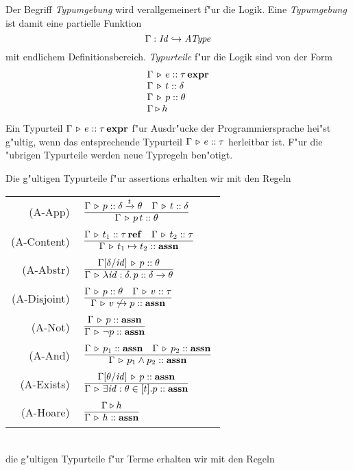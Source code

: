 \documentclass[12pt,a4paper,bigheadings]{scrartcl}
\newcommand{\assn}{\ensuremath{\mathbf{assn}}}
\newcommand{\bexpr}{\ensuremath{\mathbf{expr}}}
\newcommand{\etype}[1]{#1\,\bexpr}
\newcommand{\Atype}{\name{AType}}
\newcommand{\tto}{\ensuremath{\xrightarrow{t}}}
\renewcommand{\disjoint}[2]{\ensuremath{#2\not\hookrightarrow#1}}
\newcommand{\RN}[1]{\mbox{{\sc (#1)}}}
\begin{document}
Der Begriff {\em Typumgebung} wird verallgemeinert f"ur die Logik. Eine {\em Typumgebung} ist
damit eine partielle Funktion
\[
  \Gamma: \Id \pto \Atype
\]
mit endlichem Definitionsbereich. {\em Typurteile} f"ur die Logik sind von der Form
\[\begin{array}{l}
  \Tj{\Gamma}{e}{\etype{\tau}} \\
  \Tj{\Gamma}{t}{\delta} \\
  \Tj{\Gamma}{p}{\theta} \\
  \Tjh{\Gamma}{h}
\end{array}\]
Ein Typurteil $\Tj{\Gamma}{e}{\etype{\tau}}$ f"ur Ausdr"ucke der Programmiersprache hei"st
g"ultig, wenn das entsprechende Typurteil $\Gamma \, \triangleright \, e\mathrel{::}\tau$ herleitbar ist. F"ur die
"ubrigen Typurteile werden neue Typregeln ben"otigt.

Die g"ultigen Typurteile f"ur assertions erhalten wir mit den Regeln \\[3mm]
\begin{tabular}{rl}
  \RN{A-App} & $\regel{\Tj{\Gamma}{p}{\delta \tto \theta} \quad \Tj{\Gamma}{t}{\delta}}
                      {\Tj{\Gamma}{\app{p}{t}}{\theta}}$ \\[1mm]
  \RN{A-Content} & $\regel{\Tj{\Gamma}{t_1}{\reftype{\tau}} \quad \Tj{\Gamma}{t_2}{\tau}}
                          {\Tj{\Gamma}{t_1 \mapsto t_2}{\assn}}$ \\[1mm]
  \RN{A-Abstr} & $\regel{\Tj{\Gamma[\delta/\id]}{p}{\theta}}
                        {\Tj{\Gamma}{\abstr{\id:\delta}{p}}{\delta \to \theta}}$ \\[1mm]
  \RN{A-Disjoint} & $\regel{\Tj{\Gamma}{p}{\theta} \quad \Tj{\Gamma}{v}{\tau}}
                           {\Tj{\Gamma}{\disjoint{p}{v}}{\assn}}$ \\[1mm]
  \RN{A-Not} & $\regel{\Tj{\Gamma}{p}{\assn}}
                      {\Tj{\Gamma}{\neg p}{\assn}}$ \\[1mm]
  \RN{A-And} & $\regel{\Tj{\Gamma}{p_1}{\assn} \quad \Tj{\Gamma}{p_2}{\assn}}
                      {\Tj{\Gamma}{p_1 \wedge p_2}{\assn}}$ \\[1mm]
  \RN{A-Exists} & $\regel{\Tj{\Gamma[\theta/\id]}{p}{\assn}}
                         {\Tj{\Gamma}{\exists \id:\theta\in[t].p}{\assn}}$ \\[1mm]
  \RN{A-Hoare} & $\regel{\Tjh{\Gamma}{h}}
                        {\Tj{\Gamma}{h}{\assn}}$
\end{tabular} \\[3mm]
die g"ultigen Typurteile f"ur Terme erhalten wir mit den Regeln \\[3mm]
\end{document}
